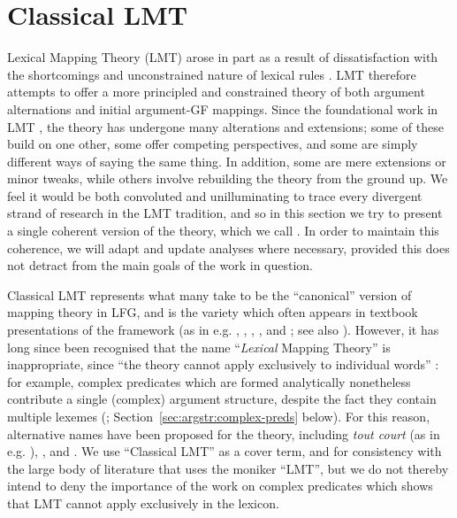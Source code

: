 \documentclass[output=paper]{langscibook}
\begin{document}
\section{Classical LMT}
\label{sec:argstr:classical-lmt}

Lexical Mapping Theory (LMT) arose in part as a result of dissatisfaction with
the shortcomings and unconstrained nature of lexical rules
\citep{Bresnan:Monotonicity}. LMT therefore attempts to offer a more principled
and constrained theory of both argument alternations and initial argument-GF
mappings. Since the foundational work in LMT
\citep{Levin1986,bresnan1989locative,bresnanzaenen90}, the theory has undergone
many alterations and extensions; some of these build on one other, some offer
competing perspectives, and some are simply different ways of saying the same
thing. In addition, some are mere extensions or minor tweaks, while others
involve rebuilding the theory from the ground up. We feel it would be both
convoluted and unilluminating to trace every divergent strand of research in the
LMT tradition, and so in this section we try to present a single coherent
version of the theory, which we call . In order to maintain
this coherence, we will adapt and update analyses where necessary, provided this
does not detract from the main goals of the work in question.

Classical LMT represents what many take to be the ``canonical'' version of
mapping theory in LFG, and is the variety which often appears in textbook
presentations of the framework (as in e.g. \citealt[202ff.]{dalrymple01},
\citealt[ch.~4]{falk2001lexical}, \citealt[ch.~14]{bresnan2001lexical},
\citealt[ch.~14]{BresnanEtAl2016}, and \citealt[ch.~8]{BoNoSa19}; see also
\citealt[pp.~117ff.]{Butt2006}). However, it has long since been recognised that
the name ``\emph{Lexical} Mapping Theory'' is inappropriate, since ``the theory
cannot apply exclusively to individual words'' \citep[212]{dalrymple01}: for
example, complex predicates which are formed analytically nonetheless contribute
a single (complex) argument structure, despite the fact they contain multiple
lexemes (\citealp{MohananT1994,Butt1995,alsina1996the-role};
Section~\ref{sec:argstr:complex-preds} below). For this reason, alternative names have
been proposed for the theory, including  \textit{tout court}
(as in e.g. \citealt{KM15}), 
\citep{alsina1996the-role}, and 
\citep{butt1997architecture}. We use ``Classical LMT'' as a cover term, and for
consistency with the large body of literature that uses the moniker ``LMT'', but
we do not thereby intend to deny the importance of the work on complex
predicates which shows that LMT cannot apply exclusively in the lexicon.
\end{document}
